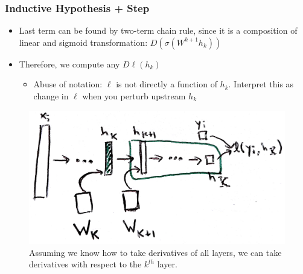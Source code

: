 \documentclass[10pt,mathserif]{beamer}
\begin{document}
\begin{frame}
  \frametitle{Inductive Hypothesis + Step}
  \begin{itemize}
  \item Last term can be found by two-term chain rule, since it is a composition
    of linear and sigmoid transformation: $D\left(\sigma\left(W^{k +
      1}h_{k}\right)\right)$
  \item Therefore, we compute any $D\ell\left(h_k\right)$
    \begin{itemize}
    \item Abuse of notation: $\ell$ is not directly a function of $h_k$.
      Interpret this as change in $\ell$ when you perturb upstream $h_k$
    \end{itemize}
  \end{itemize}
\begin{figure}[ht]
  \centering
  \includegraphics[width=0.5\paperwidth]{figure/backprop_inductive_step}
  \caption{Assuming we know how to take derivatives of all layers, we can take
    derivatives with respect to the $k^{th}$
    layer. \label{fig:backprop_inductive_step} }
\end{figure}
\end{frame}
\end{document}
